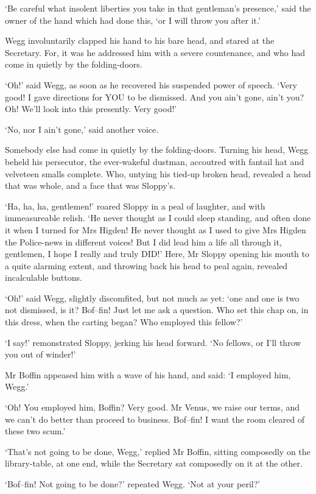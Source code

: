 ‘Be careful what insolent liberties you take in that gentleman’s
presence,’ said the owner of the hand which had done this, ‘or I will
throw you after it.’

Wegg involuntarily clapped his hand to his bare head, and stared at the
Secretary. For, it was he addressed him with a severe countenance, and
who had come in quietly by the folding-doors.

‘Oh!’ said Wegg, as soon as he recovered his suspended power of speech.
‘Very good! I gave directions for YOU to be dismissed. And you ain’t
gone, ain’t you? Oh! We’ll look into this presently. Very good!’

‘No, nor I ain’t gone,’ said another voice.

Somebody else had come in quietly by the folding-doors. Turning his
head, Wegg beheld his persecutor, the ever-wakeful dustman, accoutred
with fantail hat and velveteen smalls complete. Who, untying his
tied-up broken head, revealed a head that was whole, and a face that was
Sloppy’s.

‘Ha, ha, ha, gentlemen!’ roared Sloppy in a peal of laughter, and with
immeasureable relish. ‘He never thought as I could sleep standing, and
often done it when I turned for Mrs Higden! He never thought as I used
to give Mrs Higden the Police-news in different voices! But I did lead
him a life all through it, gentlemen, I hope I really and truly DID!’
Here, Mr Sloppy opening his mouth to a quite alarming extent, and
throwing back his head to peal again, revealed incalculable buttons.

‘Oh!’ said Wegg, slightly discomfited, but not much as yet: ‘one and one
is two not dismissed, is it? Bof--fin! Just let me ask a question. Who
set this chap on, in this dress, when the carting began? Who employed
this fellow?’

‘I say!’ remonstrated Sloppy, jerking his head forward. ‘No fellows, or
I’ll throw you out of winder!’

Mr Boffin appeased him with a wave of his hand, and said: ‘I employed
him, Wegg.’

‘Oh! You employed him, Boffin? Very good. Mr Venus, we raise our terms,
and we can’t do better than proceed to business. Bof--fin! I want the
room cleared of these two scum.’

‘That’s not going to be done, Wegg,’ replied Mr Boffin, sitting
composedly on the library-table, at one end, while the Secretary sat
composedly on it at the other.

‘Bof--fin! Not going to be done?’ repeated Wegg. ‘Not at your peril?’

